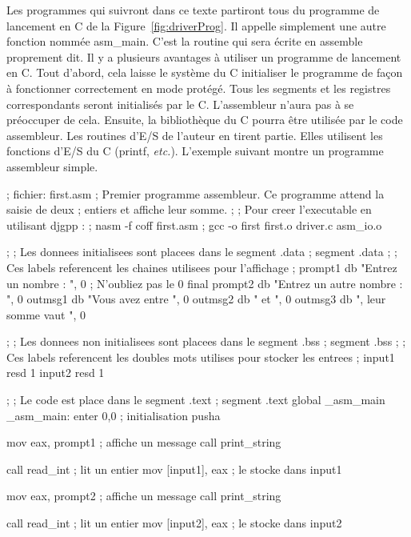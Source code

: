Les programmes qui suivront dans ce texte partiront tous du programme
de lancement en C de la Figure~\ref{fig:driverProg}. Il appelle simplement
une autre fonction nommée {\code asm\_main}. C'est la routine qui sera
écrite en assemble proprement dit. Il y a plusieurs avantages à utiliser
un programme de lancement en C. Tout d'abord, cela laisse le système du C
initialiser le programme de façon à fonctionner correctement en mode protégé.
Tous les segments et les registres correspondants seront initialisés par le C.
L'assembleur n'aura pas à se préoccuper de cela. Ensuite, la bibliothèque
du C pourra être utilisée par le code assembleur. Les routines d'E/S de l'auteur
en tirent partie. Elles utilisent les fonctions d'E/S du C ({\code printf}, {\em etc.}).
L'exemple suivant montre un programme assembleur simple.

\begin{AsmCodeListing}[label=first.asm]
; fichier: first.asm
; Premier programme assembleur. Ce programme attend la saisie de deux
; entiers et affiche leur somme.
;
; Pour creer l'executable en utilisant djgpp :
; nasm -f coff first.asm
; gcc -o first first.o driver.c asm_io.o

;
; Les donnees initialisees sont placees dans le segment .data
;
segment .data
;
; Ces labels referencent les chaines utilisees pour l'affichage
;
prompt1 db    "Entrez un nombre : ", 0      ; N'oubliez pas le 0 final
prompt2 db    "Entrez un autre nombre : ", 0
outmsg1 db    "Vous avez entre ", 0
outmsg2 db    " et ", 0
outmsg3 db    ", leur somme vaut ", 0

;
; Les donnees non initialisees sont placees dans le segment .bss
;
segment .bss
;
; Ces labels referencent les doubles mots utilises pour stocker les entrees
;
input1  resd 1
input2  resd 1

;
; Le code est place dans le segment .text
;
segment .text
        global  _asm_main
_asm_main:
        enter   0,0              ; initialisation
        pusha

        mov     eax, prompt1     ; affiche un message
        call    print_string

        call    read_int         ; lit un entier
        mov     [input1], eax    ; le stocke dans input1

        mov     eax, prompt2     ; affiche un message
        call    print_string

        call    read_int         ; lit un entier
        mov     [input2], eax    ; le stocke dans input2


\end{AsmCodeListing}
